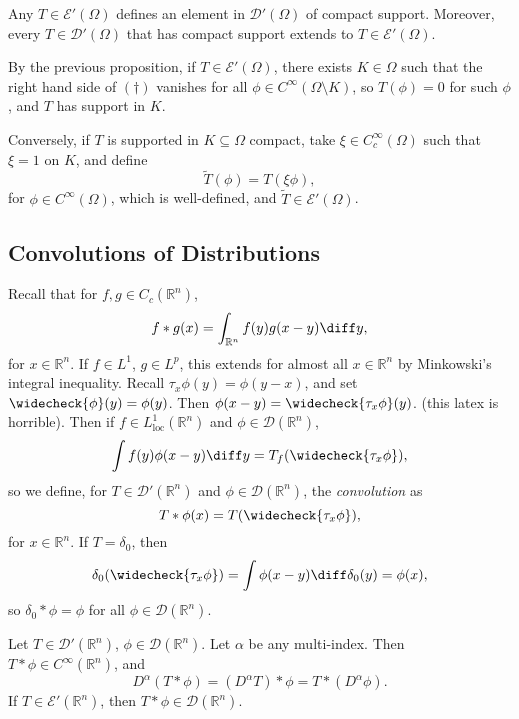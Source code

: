 \documentclass[12pt]{article}
\begin{document}
\begin{theorem}
	Any $T \in \mathcal{E}'(\Omega)$ defines an element in $\mathcal{D}'(\Omega)$ of compact support. Moreover, every $T \in \mathcal{D}'(\Omega)$ that has compact support extends to $T \in \mathcal{E}'(\Omega)$.
\end{theorem}

\begin{proofbox}
	By the previous proposition, if $T \in \mathcal{E}'(\Omega)$, there exists $K \in \Omega$ such that the right hand side of $(\dagger)$ vanishes for all $\phi \in C^\infty(\Omega\setminus K)$, so $T(\phi) = 0$ for such $\phi$, and $T$ has support in $K$.

	Conversely, if $T$ is supported in $K \subseteq \Omega$ compact, take $\xi \in C_c^\infty(\Omega)$ such that $\xi = 1$ on $K$, and define
	\[
	\tilde T(\phi) = T(\xi \phi),
	\]
	for $\phi \in C^\infty(\Omega)$, which is well-defined, and $\tilde T \in \mathcal{E}'(\Omega)$.
\end{proofbox}

\subsection{Convolutions of Distributions}
\label{sub:con_dist}

Recall that for $f, g \in C_c(\mathbb{R}^n)$,
\[
f \ast g(x) = \int_{\mathbb{R}^n}f(y) g(x - y) \diff y,
\]
for $x \in \mathbb{R}^n$. If $f \in L^1$, $g \in L^p$, this extends for almost all $x \in \mathbb{R}^n$ by Minkowski's integral inequality. Recall $\tau_x \phi(y) = \phi(y - x)$, and set $\widecheck{\phi}(y) = \phi(\- y)$. Then $\phi(x - y) = \widecheck{\tau_x \phi}(y)$. (this latex is horrible). Then if $f \in L^1_{\mathrm{loc}}(\mathbb{R}^n)$ and $\phi \in \mathcal{D}(\mathbb{R}^n)$,
\[
	\int f(y) \phi(x- y) \diff y = T_f(\widecheck{\tau_x \phi}),
\]
so we define, for $T \in \mathcal{D}'(\mathbb{R}^n)$ and $\phi \in \mathcal{D}(\mathbb{R}^n)$, the \emph{convolution} as
\[
T \ast \phi(x) = T(\widecheck{\tau_x \phi}),
\]
for $x \in \mathbb{R}^n$. If $T = \delta_0$, then
\[
	\delta_0(\widecheck{\tau_x \phi}) = \int \phi(x - y) \diff \delta_0(y) = \phi(x),
\]
so $\delta_0 \ast \phi = \phi$ for all $\phi \in \mathcal{D}(\mathbb{R}^n)$.

\begin{theorem}
	Let $T \in \mathcal{D}'(\mathbb{R}^n)$, $\phi \in \mathcal{D}(\mathbb{R}^n)$. Let $\alpha$ be any multi-index. Then $T \ast \phi \in C^\infty (\mathbb{R}^n)$, and
	\[
	D^\alpha (T \ast \phi) = (D^\alpha T) \ast \phi = T \ast (D^\alpha \phi).
	\]
	If $T \in \mathcal{E}'(\mathbb{R}^n)$, then $T \ast \phi \in \mathcal{D}(\mathbb{R}^n)$.
\end{theorem}
\end{document}
